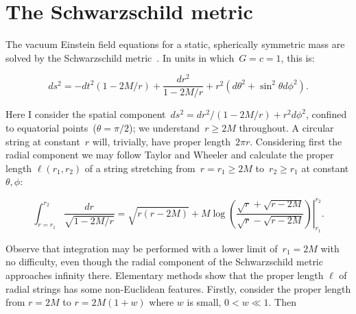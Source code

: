 \documentclass{ws-tpe}
\begin{document}
\section{The Schwarzschild metric}

The vacuum Einstein field equations for a static, spherically
symmetric mass are solved by the Schwarzschild
metric~\cite{schwarzschild1916}.  In units in which~$G=c=1$, this is:

\begin{equation}\label{schwarzschild}
ds^2= -dt^2\left(1-2M/r\right) +\frac{dr^2}{1-2M/r} + r^2\left(d\theta^2 + \sin^2\theta d\phi^2\right).
\end{equation}

\noindent Here I consider the spatial component~$ds^2=
dr^2/\left(1-2M/r\right) + r^2d\phi^2$, confined to equatorial
points~($\theta=\pi/2$); we understand~$r\geqslant 2M$ throughout.  A
circular string at constant~$r$ will, trivially, have proper
length~$2\pi r$.  Considering first the radial component we may follow
Taylor and Wheeler \cite{taylor2000} and calculate the proper length
$\ell\left(r_1,r_2\right)$ of a string stretching from~$r=r_1\geqslant
2M$ to~$r_2\geqslant r_1$ at constant $\theta,\phi$:



\begin{equation}\label{radial_string_length}
  \int_{r=r_1}^{r_2}\frac{dr}{\sqrt{1-2M/r}}=
  \left.
  \sqrt{r(r-2M)} +M\log\left(
  \frac{\sqrt{r}+\sqrt{r-2M}}{\sqrt{r}-\sqrt{r-2M}}\right)
  \right|_{r_1}^{r_2}.
  \end{equation}

Observe that integration may be performed with a lower limit
of~$r_1=2M$ with no difficulty, even though the radial component of
the Schwarzschild metric approaches infinity there.  Elementary
methods show that the proper length $\ell$ of radial strings has some
non-Euclidean features.  Firstly, consider the proper length from
$r=2M$ to $r=2M(1+w)$ where $w$ is small, $0<w\ll 1$.  Then

\end{document}
